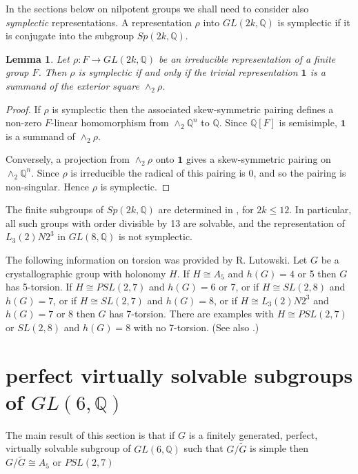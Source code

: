 \documentclass[12pt]{amsart}
\renewcommand{\leq}{\leqslant}
\newtheorem{lemma}[theorem]{Lemma}
\begin{document}
In the sections below on nilpotent groups we shall need to consider also
{\it symplectic\/} representations.
A representation $\rho$ into  $GL(2k,\mathbb{Q})$ is symplectic if it is conjugate
into the subgroup $Sp(2k,\mathbb{Q})$.

\begin{lemma}
\label{symplectic}
Let $\rho:F\to{GL(2k,\mathbb{Q})}$ be an irreducible representation of 
a finite group $F$. 
Then $\rho$ is symplectic if and only if the trivial representation $\mathbf{1}$ is a summand of the exterior square $\wedge_2\rho$.
\end{lemma}

\begin{proof}
If $\rho$ is symplectic then the associated skew-symmetric pairing defines 
a non-zero $F$-linear homomorphism from $\wedge_2\mathbb{Q}^n$ to $\mathbb{Q}$.
Since $\mathbb{Q}[F]$ is semisimple, 
$\mathbf{1}$ is a summand of $\wedge_2\rho$.

Conversely,  a projection from $\wedge_2\rho$ onto $\mathbf{1}$ gives a skew-symmetric pairing on $\wedge_2\mathbb{Q}^n$. 
Since $\rho$ is irreducible the radical of this pairing is 0, 
and so the pairing is non-singular.
Hence $\rho$ is symplectic.
\end{proof}

The finite subgroups of $Sp(2k,\mathbb{Q})$ are determined in \cite{Ki},
for $2k\leq12$. 
In particular, all such groups with order divisible by 13 are solvable,
and the representation of $L_3(2)N2^3$ in $GL(8,\mathbb{Q})$ is not symplectic.



The following information on torsion was provided by R. Lutowski.
Let $G$ be a crystallographic group with holonomy $H$.
If $H\cong{A_5}$ and $h(G)=4$ or 5 then $G$ has 5-torsion.
If $H\cong{PSL(2,7)}$ and $h(G)=6$ or 7,
or if $H\cong{SL(2,8)}$ and $h(G)=7$,
or if  $H\cong{SL(2,7)}$ and $h(G)=8$,
or if $H\cong{L_3(2)N2^3}$ and $h(G)=7$ or 8 then $G$ has 7-torsion.
There are examples with $H\cong{PSL(2,7)}$ or $SL(2,8)$ and $h(G)=8$
with no 7-torsion.  (See also \cite[Chapter 6]{HP}.)


\newpage
\section{perfect virtually solvable subgroups 
of $GL(6,\mathbb{Q})$}

The main result of this section is that if $G$ is a finitely generated, 
perfect, virtually solvable subgroup of $GL(6,\mathbb{Q})$ such that 
$G/\widetilde{G}$ is simple then $G/\widetilde{G}\cong{A_5}$ or $PSL(2,7)$
\end{document}
